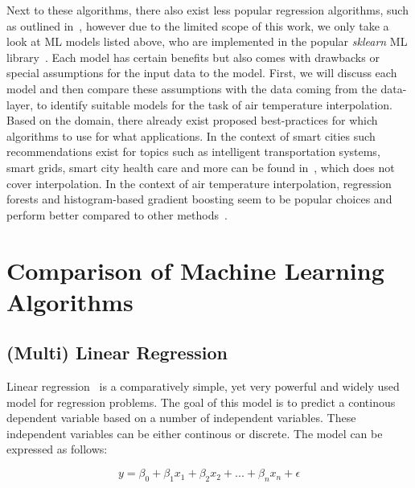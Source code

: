 
Next to these algorithms, there also exist less popular regression algorithms, such as outlined in~\cite{li2014spatial}, however due to the limited scope of this work, we only take a look at ML models listed above, who are implemented in the popular \textit{sklearn} ML library~\cite{scikit-learn}.
Each model has certain benefits but also comes with drawbacks or special assumptions for the input data to the model. First, we will discuss each model and then compare these assumptions with the data coming from the data-layer, to identify suitable models for the task of air temperature interpolation.
Based on the domain, there already exist proposed best-practices for which algorithms to use for what applications. In the context of smart cities such recommendations exist for topics such as intelligent transportation systems, smart grids, smart city health care and more can be found in~\cite{ullah2020applications}, which does not cover interpolation. In the context of air temperature interpolation, regression forests and histogram-based gradient boosting seem to be popular choices and perform better compared to other methods~\cite{apaydin2022evaluation, ho2014mapping}.

\section{Comparison of Machine Learning Algorithms}
\label{sec:comparison ml algorithms}

\subsection{(Multi) Linear Regression}
\label{subsec: linear regression}

Linear regression~\cite{montgomery2021introduction} is a comparatively simple, yet very powerful and widely used model for regression problems. The goal of this model is to predict a continous dependent variable based on a number of independent variables. These independent variables can be either continous or discrete. The model can be expressed as follows:

\begin{equation}
    y = \beta_0 + \beta_1 x_1 + \beta_2 x_2 + ... + \beta_n x_n + \epsilon
\end{equation}

